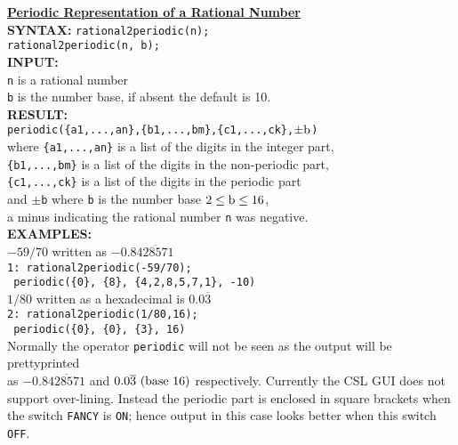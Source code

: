 \begin{tabbing}
\textbf{\underline{Periodic Representation of a Rational Number}}\\[\baselineskip]

\textbf{SYNTAX:} \hspace{3mm} 
       \= \texttt{rational2periodic(n);}\\
\> {\tt rational2periodic(n, b);}\\[\baselineskip]

\textbf{INPUT:}\\  
\> \texttt{n} \hspace{3mm} is a rational number\\
\> {\tt b} \hspace{3mm} is the number base, if absent the default is 10.\\[\baselineskip]

\textbf{RESULT:}\\
     \> {\tt periodic(\{a1,...,an\},\{b1,...,bm\},\{c1,...,ck\},$\pm{\rm b}$)}\\
 \> where  {\tt\{a1,...,an\}} is a list of the digits in the integer part,\\
 \> {\tt\{b1,...,bm\}} is a list of the digits in the non-periodic part,\\
 \> {\tt\{c1,...,ck\}} is a list of the digits in the periodic part\\
 \> and $\pm${\tt b} where {\tt b} is the number base $2 \leq {\rm b} \leq 16$, \\
 \> a minus indicating the rational number {\tt n} was negative. \\[\baselineskip]

\textbf{EXAMPLES:}\\
    \> $-59/70$ written as $-0.8\overline{428571}$\\
    \>  \texttt{1: rational2periodic(-59/70);}\\
    \> \texttt{ periodic(\{0\}, \{8\}, \{4,2,8,5,7,1\}, -10)}\\[\baselineskip]
    \> $1/80$ written as a hexadecimal is $0.0\overline{3}$\\
    \>  \texttt{2: rational2periodic(1/80,16);}\\
    \> \texttt{ periodic(\{0\}, \{0\}, \{3\}, 16)}\\[\baselineskip]

   Normally the operator {\tt periodic} will not be seen as the output will
    be prettyprinted\\
    as $-0.8\overline{428571}$ and $0.0\overline{3}\ {\rm (base\ 16)}$
    respectively. Currently the CSL GUI  does not\\
      support over-lining. Instead the periodic part is enclosed in square brackets when  \\
   the switch \texttt{FANCY} is \texttt{ON}; hence output in this case looks better when 
     this switch  \texttt{OFF}.\\
\end{tabbing}

